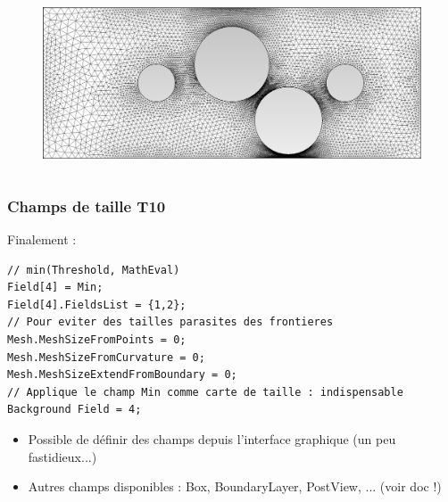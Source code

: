 \documentclass[aspectratio=169]{beamer}
\begin{document}
\begin{frame}[fragile]
\begin{columns}
\begin{column}{0.4\textwidth}
    \vspace{-2.3cm}
    \begin{figure}
      \includegraphics[width=1.02\textwidth]{figures/automatic.png}
      \caption{}
    \end{figure}
  \end{column}
\end{columns}
\end{frame}

\begin{frame}[fragile]
\frametitle{Champs de taille \hfill T10}
Finalement :
\begin{lstlisting}[belowskip=0.5mm]
// min(Threshold, MathEval)
Field[4] = Min;
Field[4].FieldsList = {1,2};
// Pour eviter des tailles parasites des frontieres
Mesh.MeshSizeFromPoints = 0;
Mesh.MeshSizeFromCurvature = 0;
Mesh.MeshSizeExtendFromBoundary = 0;
// Applique le champ Min comme carte de taille : indispensable
Background Field = 4;
\end{lstlisting}
\begin{itemize}
  \item Possible de définir des champs depuis l'interface graphique (un peu fastidieux...)
  \item Autres champs disponibles : Box, BoundaryLayer, PostView, ... (voir doc !)
\end{itemize}
\end{frame}
\end{document}
